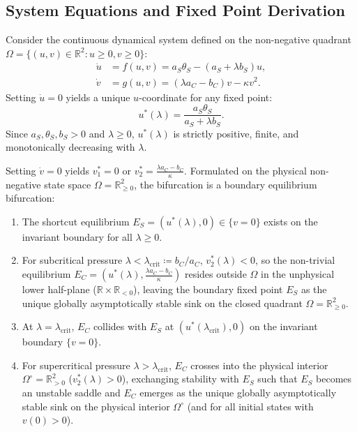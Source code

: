 \documentclass{article}
\theoremstyle{plain}
\theoremstyle{definition}
\begin{document}
\subsection{System Equations and Fixed Point Derivation}
Consider the continuous dynamical system defined on the non-negative quadrant $\Omega = \{ (u, v) \in \mathbb{R}^2 : u \ge 0, v \ge 0 \}$:
\begin{align}
    \dot{u} &= f(u, v) = a_S \theta_S - (a_S + \lambda b_S) u, \label{eq:app_u} \\
    \dot{v} &= g(u, v) = (\lambda a_C - b_C) v - \kappa v^2. \label{eq:app_v}
\end{align}
Setting $\dot{u} = 0$ yields a unique $u$-coordinate for any fixed point:
\begin{equation}
    u^*(\lambda) = \frac{a_S \theta_S}{a_S + \lambda b_S}.
\end{equation}
Since $a_S, \theta_S, b_S > 0$ and $\lambda \ge 0$, $u^*(\lambda)$ is strictly positive, finite, and monotonically decreasing with $\lambda$.

Setting $\dot{v} = 0$ yields $v_1^* = 0$ or $v_2^* = \frac{\lambda a_C - b_C}{\kappa}$. Formulated on the physical non-negative state space $\Omega = \mathbb{R}_{\ge 0}^2$, the bifurcation is a boundary equilibrium bifurcation:
\begin{enumerate}[leftmargin=*,noitemsep]
    \item The shortcut equilibrium $E_S = (u^*(\lambda), 0) \in \{v=0\}$ exists on the invariant boundary for all $\lambda \ge 0$.
    \item For subcritical pressure $\lambda < \lambda_{\text{crit}} \coloneqq b_C / a_C$, $v_2^*(\lambda) < 0$, so the non-trivial equilibrium $E_C = \left( u^*(\lambda), \frac{\lambda a_C - b_C}{\kappa} \right)$ resides outside $\Omega$ in the unphysical lower half-plane ($\mathbb{R} \times \mathbb{R}_{<0}$), leaving the boundary fixed point $E_S$ as the unique globally asymptotically stable sink on the closed quadrant $\Omega = \mathbb{R}_{\ge 0}^2$.
    \item At $\lambda = \lambda_{\text{crit}}$, $E_C$ collides with $E_S$ at $(u^*(\lambda_{\text{crit}}), 0)$ on the invariant boundary $\{v=0\}$.
    \item For supercritical pressure $\lambda > \lambda_{\text{crit}}$, $E_C$ crosses into the physical interior $\Omega^\circ = \mathbb{R}_{> 0}^2$ ($v_2^*(\lambda) > 0$), exchanging stability with $E_S$ such that $E_S$ becomes an unstable saddle and $E_C$ emerges as the unique globally asymptotically stable sink on the physical interior $\Omega^\circ$ (and for all initial states with $v(0) > 0$).
\end{enumerate}
\end{document}
